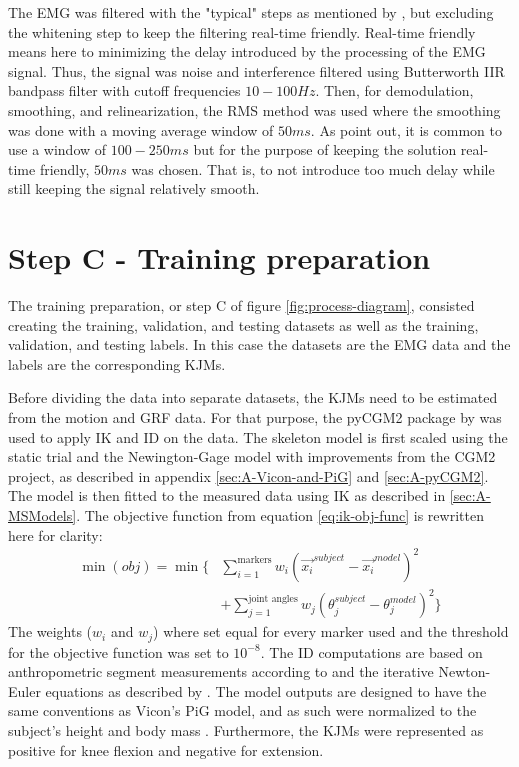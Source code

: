 \documentclass[../main.tex]{subfiles}
\begin{document}
The \ac{EMG} was filtered with the "typical" steps as mentioned by \textcite[99]{Clancy2016}, but excluding the whitening step to keep the filtering real-time friendly.
Real-time friendly means here to minimizing the delay introduced by the processing of the \ac{EMG} signal.
Thus, the signal was noise and interference filtered using Butterworth IIR bandpass filter with cutoff frequencies $10-100Hz$. 
Then, for demodulation, smoothing, and relinearization, the RMS method was used where the smoothing was done with a moving average window of $50ms$. 
As \textcite{Clancy2016} point out, it is common to use a window of $100-250 ms$ but for the purpose of keeping the solution real-time friendly, $50ms$ was chosen.
That is, to not introduce too much delay while still keeping the signal relatively smooth.

\section{Step C - Training preparation}
The training preparation, or step C of figure \ref{fig:process-diagram}, consisted creating the training, validation, and testing datasets as well as the training, validation, and testing labels.
In this case the datasets are the \ac{EMG} data and the labels are the corresponding \acp{KJM}.

Before dividing the data into separate datasets, the \acp{KJM} need to be estimated from the motion and \ac{GRF} data.
For that purpose, the pyCGM2 package by \textcite{Leboeuf2019} was used to apply \ac{IK} and \ac{ID} on the data.
The skeleton model is first scaled using the static trial and the Newington-Gage model with improvements from the CGM2 project, as described in appendix \ref{sec:A-Vicon-and-PiG} and \ref{sec:A-pyCGM2}.
The model is then fitted to the measured data using \ac{IK} as described in \ref{sec:A-MSModels}. 
The objective function from equation \ref{eq:ik-obj-func} is rewritten here for clarity:
\begin{align*}
    \min(obj) = \min\biggl\{ &\sum_{i=1}^{\text{markers}}w_i \left(\Vec{x_i}^{subject}-\Vec{x_i}^{model}\right)^2 \nonumber\\ 
    &+ \sum_{j=1}^{\text{joint angles}}w_j \left( \theta_j^{subject}-\theta_j^{model}\right)^2 \biggr\}
\end{align*}
The weights ($w_i$ and $w_j$) where set equal for every marker used and the threshold for the objective function was set to $10^{-8}$.
The \ac{ID} computations are based on anthropometric segment measurements according to \textcite{Dempster1955} and the iterative Newton-Euler equations as described by \textcite{Dumas2004}\cite{Leboeuf2019}.
The model outputs are designed to have the same conventions as Vicon's \ac{PiG} model, and as such were normalized to the subject's height and body mass \cite{Leboeuf2019, viconpig}.
Furthermore, the \acp{KJM} were represented as positive for knee flexion and negative for extension.
\end{document}
